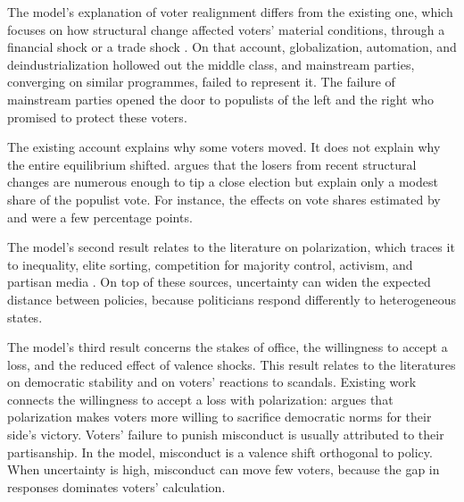 \documentclass[12pt,letterpaper]{article}
\begin{document}
The model's explanation of voter realignment differs from the existing one, which focuses on how structural change affected voters' material conditions, through a financial shock \citep{King2008,Funke2016,GurievPapaioannou2022} or a trade shock \citep{Autor2020,ColantoneStanig2018}. On that account, globalization, automation, and deindustrialization hollowed out the middle class, and mainstream parties, converging on similar programmes, failed to represent it. The failure of mainstream parties opened the door to populists of the left and the right who promised to protect these voters.

The existing account explains why some voters moved. It does not explain why the entire equilibrium shifted. \citet{Margalit2019} argues that the losers from recent structural changes are numerous enough to tip a close election but explain only a modest share of the populist vote. For instance, the effects on vote shares estimated by \citet{Autor2020} and \citet{ColantoneStanig2018} were a few percentage points.

The model's second result relates to the literature on polarization, which traces it to inequality, elite sorting, competition for majority control, activism, and partisan media \citep{McCarty2016,Bonica2014,Barber2016,Canen2020,Lee2016,Hall2019,Aldrich1983,Fiorina1999,MartinYurukoglu2017}. On top of these sources, uncertainty can widen the expected distance between policies, because politicians respond differently to heterogeneous states.

The model's third result concerns the stakes of office, the willingness to accept a loss, and the reduced effect of valence shocks. This result relates to the literatures on democratic stability and on voters' reactions to scandals. Existing work connects the willingness to accept a loss with polarization: \citet{Svolik2019} argues that polarization makes voters more willing to sacrifice democratic norms for their side's victory. Voters' failure to punish misconduct is usually attributed to their partisanship. In the model, misconduct is a valence shift orthogonal to policy. When uncertainty is high, misconduct can move few voters, because the gap in responses dominates voters' calculation.
\end{document}
